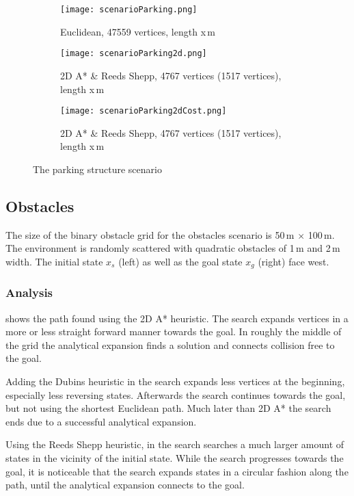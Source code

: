 \begin{figure}[h]
    \centering
    \begin{subfigure}[t]{\textwidth}
    \texttt{[image: scenarioParking.png]}
        \caption{Euclidean, 47559 vertices, length x\,m}
    \label{fig:scenarioParkingEuclidean}
    \end{subfigure}
    \begin{subfigure}[t]{\textwidth}
    \texttt{[image: scenarioParking2d.png]}
        \caption{2D A* \& Reeds Shepp, 4767 vertices (1517 vertices), length x\,m}
    \label{fig:scenarioParking2D}
    \end{subfigure}    
    \begin{subfigure}[t]{\textwidth}
    \texttt{[image: scenarioParking2dCost.png]}
        \caption{2D A* \& Reeds Shepp, 4767 vertices (1517 vertices), length x\,m}
    \label{fig:scenarioParking2dCost}
    \end{subfigure}
    \caption{The parking structure scenario}
    \label{fig:scenarioParking}
\end{figure}

\subsection{Obstacles}
The size of the binary obstacle grid for the obstacles scenario is 50\,m $\times$ 100\,m. The environment is randomly scattered with quadratic obstacles of 1\,m and 2\,m width. The initial state $x_s$ (left) as well as the goal state $x_g$ (right) face west.

\subsubsection{Analysis}
 shows the path found using the 2D A* heuristic. The search expands vertices in a more or less straight forward manner towards the goal. In roughly the middle of the grid the analytical expansion finds a solution and connects collision free to the goal.

Adding the Dubins heuristic in  the search expands less vertices at the beginning, especially less reversing states. Afterwards the search continues towards the goal, but not using the shortest Euclidean path. Much later than 2D A* the search ends due to a successful analytical expansion.

Using the Reeds Shepp heuristic, in  the search searches a much larger amount of states in the vicinity of the initial state. While the search progresses towards the goal, it is noticeable that the search expands states in a circular fashion along the path, until the analytical expansion connects to the goal.

